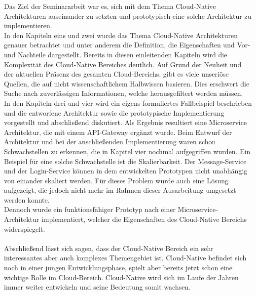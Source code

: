 Das Ziel der Seminararbeit war es, sich mit dem Thema Cloud-Native Architekturen auseinander zu setzten und prototypisch eine solche Architektur zu implementieren.\\
In den Kapiteln eins und zwei wurde das Thema Cloud-Native Architekturen genauer betrachtet und unter anderem die Definition, die Eigenschaften und Vor-und Nachteile dargestellt. Bereits in diesen einleitenden Kapiteln wird die Komplexität des Cloud-Native Bereiches deutlich. Auf Grund der Neuheit und der aktuellen Präsenz des gesamten Cloud-Bereichs, gibt es viele unseriöse Quellen, die auf nicht wissenschaftlichem Halbwissen basieren. Dies erschwert die Suche nach zuverlässigen Informationen, welche herausgefiltert werden müssen.\\
In den Kapiteln drei und vier wird ein eigens formuliertes Fallbeispiel beschrieben und die entworfene Architektur sowie die prototypische Implementierung vorgestellt und abschließend diskutiert. Als Ergebnis resultiert eine Microservice Architektur, die mit einem API-Gateway ergänzt wurde. Beim Entwurf der Architektur und bei der anschließenden Implementierung waren schon Schwachstellen zu erkennen, die in Kapitel vier nochmal aufgegriffen wurden. Ein Beispiel für eine solche Schwachstelle ist die Skalierbarkeit. Der Message-Service und der Login-Service können in dem entwickelten Prototypen nicht unabhängig von einander skaliert werden. Für dieses Problem wurde auch eine Lösung aufgezeigt, die jedoch nicht mehr im Rahmen dieser Ausarbeitung umgesetzt werden konnte.\\
Dennoch wurde ein funktionsfähiger Prototyp nach einer Microservice-Architektur implementiert, welcher die Eigenschaften des Cloud-Native Bereichs widerspiegelt.\\
\\
Abschließend lässt sich sagen, dass der Cloud-Native Bereich ein sehr interessantes aber auch komplexes Themengebiet ist. Cloud-Native befindet sich noch in einer jungen Entwicklungsphase, spielt aber bereits jetzt schon eine wichtige Rolle im Cloud-Bereich. Cloud-Native wird sich im Laufe der Jahren immer weiter entwickeln und seine Bedeutung somit wachsen. 